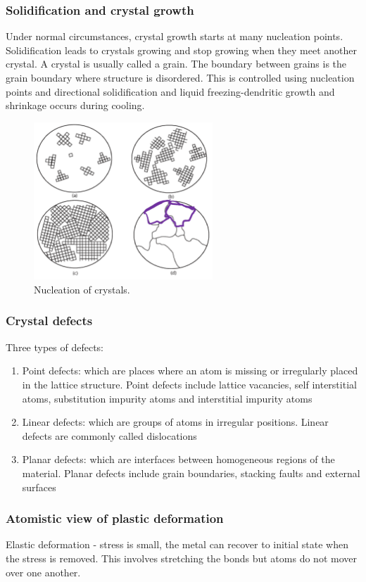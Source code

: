 \subsubsection{Solidification and crystal growth}
Under normal circumstances, crystal growth starts at many nucleation points. Solidification leads to crystals growing and stop growing when they meet another crystal. A crystal is usually called a grain. The boundary between grains is the grain boundary where structure is disordered. This is controlled using nucleation points and directional solidification and liquid freezing-dendritic growth and shrinkage occurs during cooling. 
\begin{figure}[H]
	\centering
	\includegraphics[width = 0.6\textwidth]{./img/figure14.png}
	\caption{Nucleation of crystals.}
\end{figure}
\subsubsection{Crystal defects}
Three types of defects:
\begin{enumerate}
	\item Point defects: which are places where an atom is missing or irregularly placed in the lattice structure. Point defects include lattice vacancies, self interstitial atoms, substitution impurity atoms and interstitial impurity atoms
	\item Linear defects: which are groups of atoms in irregular positions. Linear defects are commonly called dislocations
	\item Planar defects: which are interfaces between homogeneous regions of the material. Planar defects include grain boundaries, stacking faults and external surfaces
\end{enumerate}
\subsubsection{Atomistic view of plastic deformation}
Elastic deformation - stress is small, the metal can recover to initial state when the stress is removed. This involves stretching the bonds but atoms do not mover over one another.

